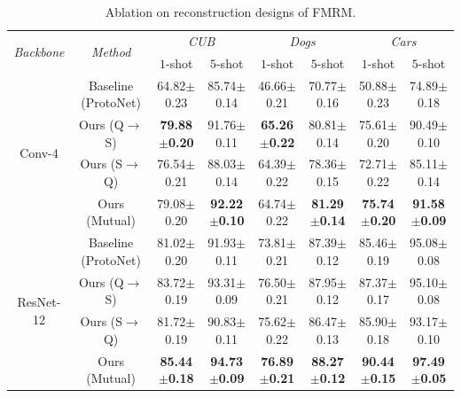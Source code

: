 \documentclass[letterpaper]{article} %
\begin{document}
\begin{table}[!htp]
\centering
\caption{Ablation on reconstruction designs of FMRM.}
\label{tab:4}
\begin{tabular}{cccccccc}
\toprule[1pt]

\multirow{2}{*}{\it{Backbone}} 
& \multirow{2}{*}{\it{Method}} 
& \multicolumn{2}{c}{\it{CUB}}                                  
& \multicolumn{2}{c}{\it{Dogs}} 
& \multicolumn{2}{c}{\it{Cars}} \\  

&                             
& \multicolumn{1}{c}{$1$-shot}    
& \multicolumn{1}{c}{$5$-shot}    
& \multicolumn{1}{c}{$1$-shot}     
& \multicolumn{1}{c}{$5$-shot} 
& \multicolumn{1}{c}{$1$-shot}     
& \multicolumn{1}{c}{$5$-shot} \\ \midrule

\multirow{4}{*}{Conv-4}
& 
Baseline (ProtoNet)     
& 64.82$\pm$0.23
& 85.74$\pm$0.14
& 46.66$\pm$0.21
& 70.77$\pm$0.16 
& 50.88$\pm$0.23
& 74.89$\pm$0.18 \\ 

& 
Ours (Q$\to$S)
& \textbf{79.88$\pm$0.20}
& 91.76$\pm$0.11
& \textbf{65.26$\pm$0.22}
& 80.81$\pm$0.14 
& 75.61$\pm$0.20       
& 90.49$\pm$0.10 \\ 

& 
Ours (S$\to$Q)         
& 76.54$\pm$0.21
& 88.03$\pm$0.14
& 64.39$\pm$0.22
& 78.36$\pm$0.15 
& 72.71$\pm$0.22       
& 85.11$\pm$0.14 \\ 
                            
& 
Ours (Mutual)
&  79.08$\pm$0.20
& \textbf{92.22$\pm$0.10}
&  64.74$\pm$0.22
& \textbf{81.29$\pm$0.14} 
& \textbf{75.74$\pm$0.20}
& \textbf{91.58$\pm$0.09} \\ \midrule
                            
\multirow{4}{*}{ResNet-12}
& 
Baseline (ProtoNet)               
& 81.02$\pm$0.20
& 91.93$\pm$0.11
& 73.81$\pm$0.21
& 87.39$\pm$0.12 
& 85.46$\pm$0.19         
& 95.08$\pm$0.08 \\ 

& 
Ours (Q$\to$S)          
& 83.72$\pm$0.19
& 93.31$\pm$0.09
& 76.50$\pm$0.21
& 87.95$\pm$0.12 
& 87.37$\pm$0.17       
& 95.10$\pm$0.08 \\
                            
& 
Ours (S$\to$Q) 
& 81.72$\pm$0.19
& 90.83$\pm$0.11
& 75.62$\pm$0.22
& 86.47$\pm$0.13 
& 85.90$\pm$0.18       
& 93.17$\pm$0.10 \\ 
                            
& 
Ours (Mutual)
& \textbf{85.44$\pm$0.18}
& \textbf{94.73$\pm$0.09}
& \textbf{76.89$\pm$0.21}
& \textbf{88.27$\pm$0.12} 
& \textbf{90.44$\pm$0.15} 
& \textbf{97.49$\pm$0.05} \\ \bottomrule
\end{tabular}
\end{table}
\end{document}

